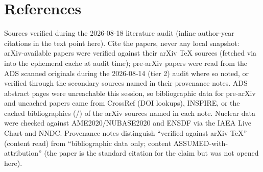 %

\section*{References}
\label{sec:references}

Sources verified during the 2026-08-18 literature audit (inline author-year citations in the text point here). Cite the papers, never any local snapshot: arXiv-available papers were verified against their arXiv TeX sources (fetched via
 into the ephemeral  cache at audit time); pre-arXiv papers were read from the ADS scanned originals during the 2026-08-14 (tier 2) audit where so noted, or verified through the secondary sources named in their provenance notes. ADS abstract pages were unreachable this session, so bibliographic data for pre-arXiv and uncached papers came from CrossRef (DOI lookups), INSPIRE, or the cached bibliographies (/) of the arXiv sources named in each note. Nuclear data were checked against AME2020/NUBASE2020 and ENSDF via the IAEA Live Chart and NNDC. Provenance notes distinguish ``verified against arXiv TeX'' (content read) from ``bibliographic data only; content ASSUMED-with-attribution'' (the paper is the standard citation for the claim but was not opened here).

\nocite{fuller1980,fuller1982a,fuller1982b,guidry2013b,hix2003,langanke2003b,%
        paxton2019,seitenzahl2008,smith2024,woosley2005}

